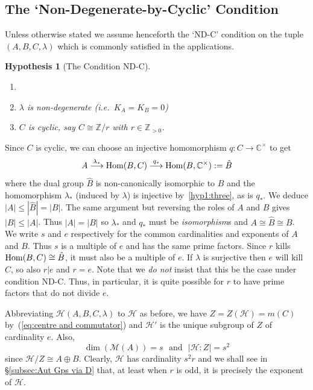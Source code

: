 \documentclass[12pt]{article}
\newtheorem{hyp}{Hypothesis}[section]
\newcommand{\bbC}{\ensuremath{\mathbb{C}}}\newcommand{\bbCp}{\ensuremath{\mathbb{C}_p}}
\newcommand{\bbZ}{\ensuremath{\mathbb{Z}}}
\newcommand{\cH}{\ensuremath{\mathcal{H}}}
\newcommand{\cM}{\mathcal{M}}
\newcommand{\Hom}{{\rm Hom}}
\newcommand{\ie}{{\em i.e.}}
\newcommand{\Zover}[1]{\ensuremath{\bbZ/#1}}
\newcommand{\Hei}[4]{\cH({#1},{#2},{#3},{#4})}
\newcommand{\HeiStan}{\Hei{A}{B}{C}{\lambda}}
\begin{document}
\subsection{The `Non-Degenerate-by-Cyclic' Condition}\label{subsec:ND-C}
Unless otherwise stated we assume henceforth the `ND-C' condition on the tuple $(A,B,C,\lambda)$ which is commonly satisfied in the applications.  
\begin{hyp}[The Condition ND-C]\label{hyp1}
	\begin{enumerate}\item[] 
	    \item\label{hyp1:three} $\lambda$ is non-degenerate (\ie\ $K_A=K_B=0$)
		\item\label{hyp1:two} $C$ is cyclic, say $C\cong \Zover{r}$ with $r\in\bbZ_{>0}$. 
		\end{enumerate}
\end{hyp} 
Since $C$ is cyclic, we can choose an injective homomorphism $q:C\rightarrow\bbC^\times$ to get \begin{equation}\label{eq:dual maps}
A\stackrel{\lambda_\ast}{\longrightarrow}\Hom(B,C)\stackrel{q_\ast}{\longrightarrow}\Hom(B,\bbC^\times ):=\hat{B}
\end{equation}
where the dual group $\hat{B}$ is non-canonically isomorphic to $B$ and the homomorphism $\lambda_\ast$ (induced by $\lambda$) is injective by~\ref{hyp1:three}, as is $q_\ast$. We deduce $|A|\leq |\hat{B}|=|B|$. The same argument but reversing the roles of $A$ and $B$  gives $|B|\leq |A|$. Thus $|A|=|B|$ so $\lambda_\ast$ and $q_\ast$ must be  \textit{isomorphism}s and $A\cong\hat{B}\cong B$. 
We write $s$ and $e$ respectively for the common cardinalities and exponents of $A$ and $B$. Thus $s$ is a multiple of $e$ and has the same prime factors. Since $r$ kills $\Hom(B,C)\cong\hat{B}$, it must also be a multiple of $e$. If $\lambda$ is surjective then $e$ will kill $C$, so also $r|e$ and $r=e$. Note that we \textit{do not} insist that this be the case under condition ND-C. Thus, in particular, it is quite possible for $r$ to have prime factors that do not divide $e$.

Abbreviating $\HeiStan$ to $\cH$ as before,   
we have $Z=Z(\cH)=m(C)$ by~(\ref{eq:centre and commutator})  and $\cH'$ is the unique subgroup of $Z$ of cardinality $e$. Also,
\begin{equation}\label{eq:all set up for an SV rep}
\dim(\cM(A))=s\ \ \ \mbox{and}\ \ \ |\cH:Z|=s^2
\end{equation}
since $\cH/Z\cong A\oplus B$. Clearly, $\cH$ has cardinality $s^2 r$ and we shall see in \S\ref{subsec:Aut Gps via D} that, at least when $r$ is odd, it is precisely the exponent of $\cH$.
\end{document}
